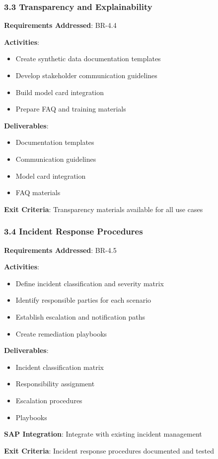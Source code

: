 \subsubsection{3.3 Transparency and Explainability}

\begin{tcolorbox}[colback=orange!5,colframe=orange!70,title=3.3 External Transparency]
\textbf{Requirements Addressed}: BR-4.4

\textbf{Activities}:
\begin{itemize}
  \item Create synthetic data documentation templates
  \item Develop stakeholder communication guidelines
  \item Build model card integration
  \item Prepare FAQ and training materials
\end{itemize}

\textbf{Deliverables}:
\begin{itemize}
  \item Documentation templates
  \item Communication guidelines
  \item Model card integration
  \item FAQ materials
\end{itemize}

\textbf{Exit Criteria}: Transparency materials available for all use cases
\end{tcolorbox}

\subsubsection{3.4 Incident Response Procedures}

\begin{tcolorbox}[colback=orange!5,colframe=orange!70,title=3.4 Incident Management]
\textbf{Requirements Addressed}: BR-4.5

\textbf{Activities}:
\begin{itemize}
  \item Define incident classification and severity matrix
  \item Identify responsible parties for each scenario
  \item Establish escalation and notification paths
  \item Create remediation playbooks
\end{itemize}

\textbf{Deliverables}:
\begin{itemize}
  \item Incident classification matrix
  \item Responsibility assignment
  \item Escalation procedures
  \item Playbooks
\end{itemize}

\textbf{SAP Integration}: Integrate with existing incident management

\textbf{Exit Criteria}: Incident response procedures documented and tested
\end{tcolorbox}

